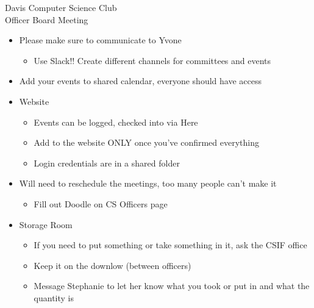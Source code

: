 \documentclass{article}
\begin{document}
\begin{Minutes}{Davis Computer Science Club\\Officer Board Meeting}





\maketitle

\begin{itemize}
\item Please make sure to communicate to Yvone
    \begin{itemize}
    \item Use Slack!! Create different channels for committees and events
    \end {itemize}
\item Add your events to shared calendar, everyone should have access
\item Website
    \begin{itemize}
    \item Events can be logged, checked into via Here
    \item Add to the website ONLY once you’ve confirmed everything
    \item Login credentials are in a shared folder
    \end{itemize}
\item Will need to reschedule the meetings, too many people can’t make it
    \begin{itemize}
    \item Fill out Doodle on CS Officers page
    \end{itemize}
\item Storage Room 
    \begin{itemize}
    \item If you need to put something or take something in it, ask the CSIF office
    \item Keep it on the downlow (between officers)
    \item Message Stephanie to let her know what you took or put in and what the quantity is
    \end{itemize}
\end{itemize}


\end{Minutes}
\end{document}
